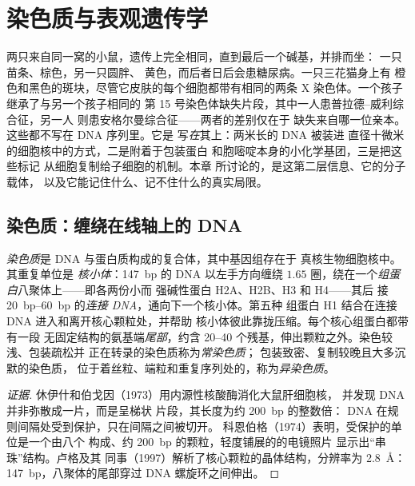 \chapter{染色质与表观遗传学}\label{ch:b3:chromatin-epigenetics}

两只来自同一窝的小鼠，遗传上完全相同，直到最后一个碱基，并排而坐：
一只苗条、棕色，另一只圆胖、
黄色，而后者日后会患糖尿病。一只三花猫身上有
橙色和黑色的斑块，尽管它皮肤的每个细胞都带有相同的两条
X 染色体。一个孩子继承了与另一个孩子相同的
第 15 号染色体缺失片段，其中一人患普拉德–威利综合征，另一人
则患安格尔曼综合征——两者的差别仅在于
缺失来自哪一位亲本。这些都不写在 DNA 序列里。它是
写\emph{在}其上：两米长的 DNA 被装进
直径十微米的细胞核中的方式，二是附着于包装蛋白
和胞嘧啶本身的小化学基团，三是把这些标记
从细胞复制给子细胞的机制。本章
所讨论的，是这第二层信息、它的分子载体，
以及它能记住什么、记不住什么的真实局限。

\section{染色质：缠绕在线轴上的 DNA}

\begin{definition}[核小体与染色质]\label{def:b3:chromatin-epigenetics:nucleosome}
\emph{染色质}是 DNA 与蛋白质构成的复合体，其中基因组存在于
真核生物细胞核中。其重复单位是
\emph{核小体}：\qty{147}{bp} 的 DNA 以左手方向缠绕
$1.65$ 圈，绕在一个\emph{组蛋白}八聚体上——即各两份小而
强碱性蛋白 H2A、H2B、H3 和 H4——其后
接 \qtyrange{20}{60}{bp} 的\emph{连接 DNA}，通向下一个核小体。第五种
组蛋白 H1 结合在连接 DNA 进入和离开核心颗粒处，并帮助
核小体彼此靠拢压缩。每个核心组蛋白都带有一段
无固定结构的氨基端\emph{尾部}，约含 \numrange{20}{40}
个残基，伸出颗粒之外。染色较浅、包装疏松并
正在转录的染色质称为\emph{常染色质}；
包装致密、复制较晚且大多沉默的染色质，
位于着丝粒、端粒和重复序列处的，称为\emph{异染色质}。
\end{definition}

\begin{proof}[证据]
休伊什和伯戈因（1973）用内源性核酸酶消化大鼠肝细胞核，
并发现 DNA 并非弥散成一片，而是呈梯状
片段，其长度为约 \qty{200}{bp} 的整数倍：
DNA 在规则间隔处受到保护，只在间隔之间被切开。
科恩伯格（1974）表明，受保护的单位是一个由八个
构成、约 \qty{200}{bp} 的颗粒，轻度铺展的的电镜照片
显示出“串珠”结构。卢格及其
同事（1997）解析了核心颗粒的晶体结构，分辨率为
\qty{2.8}{\angstrom}：\qty{147}{bp}，八聚体的尾部穿过
DNA 螺旋环之间伸出。
\end{proof}

